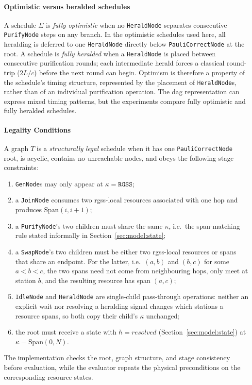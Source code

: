 \paragraph{Optimistic versus heralded schedules}
A schedule $\Sigma$ is \emph{fully optimistic} when no \texttt{HeraldNode} separates consecutive \texttt{PurifyNode} steps on any branch. In the optimistic schedules used here, all heralding is deferred to one \texttt{HeraldNode} directly below \texttt{PauliCorrectNode} at the root. A schedule is \emph{fully heralded} when a \texttt{HeraldNode} is placed between consecutive purification rounds; each intermediate herald forces a classical round-trip ($2L/c$) before the next round can begin. Optimism is therefore a property of the schedule's timing structure, represented by the placement of \texttt{HeraldNode}s, rather than of an individual purification operation. The \Gls{dag} representation can express mixed timing patterns, but the experiments compare fully optimistic and fully heralded schedules.

\paragraph{Legality Conditions}
\label{sec:model:legality}

A graph $T$ is a \emph{structurally legal} schedule when it has one \texttt{PauliCorrectNode} root, is acyclic, contains no unreachable nodes, and obeys the following stage constraints:
\begin{enumerate}
    \item[(i)] \texttt{GenNode}s may only appear at $\kappa = \mathtt{RGSS}$;
    \item[(ii)] a \texttt{JoinNode} consumes two \Gls{rgss}-local resources associated with one hop and produces $\mathrm{Span}(i,i+1)$;
    \item[(iii)] a \texttt{PurifyNode}'s two children must share the same $\kappa$, i.e.\ the span-matching rule stated informally in Section~\ref{sec:model:state};
    \item[(iv)] a \texttt{SwapNode}'s two children must be either two \Gls{rgss}-local resources or spans that share an endpoint. For the latter, i.e.\ $(a,b)$ and $(b,c)$ for some $a<b<c$, the two spans need not come from neighbouring hops, only meet at station $b$, and the resulting resource has span $(a,c)$;
    \item[(v)] \texttt{IdleNode} and \texttt{HeraldNode} are single-child pass-through operations: neither an explicit wait nor resolving a heralding signal changes which stations a resource spans, so both copy their child's $\kappa$ unchanged;
    \item[(vi)] the root must receive a state with $h=\mathit{resolved}$ (Section~\ref{sec:model:state}) at $\kappa=\mathrm{Span}(0,N)$.
\end{enumerate}
The implementation checks the root, graph structure, and stage consistency before evaluation, while the evaluator repeats the physical preconditions on the corresponding resource states.

